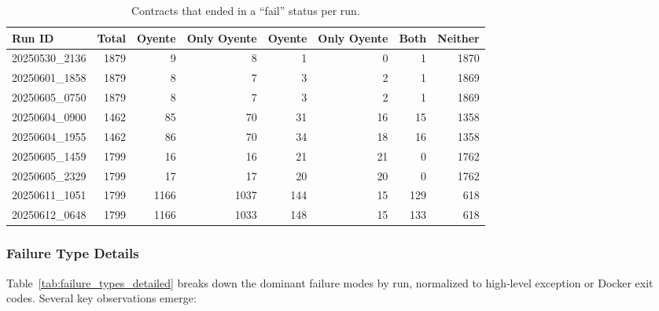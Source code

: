 \documentclass{article}
\newcommand\OY{Oyente}
\newcommand\OYp{\OY\raisebox{0.3ex}{\smaller +}}
\newcommand\CGTrbcA{20250530\_2136}%
\newcommand\CGTrbcB{20250601\_1858}%
\newcommand\CGTrbcC{20250605\_0750}%
\newcommand\CGTsscA{20250604\_0900}%
\newcommand\CGTsscB{20250604\_1955}%
\newcommand\SKCrbcA{20250605\_1459}%
\newcommand\SKCrbcB{20250605\_2329}%
\newcommand\SKCsscA{20250611\_1051}%
\newcommand\SKCsscB{20250612\_0648}%
\begin{document}
	\begin{table}[ht]
		\centering
		\begin{tabular}{lrrrrrrr}
			\toprule
			\textbf{Run ID}      & \textbf{Total} & \textbf{\OY} & \textbf{Only \OY}
			& \textbf{\OYp} & \textbf{Only \OYp}
			& \textbf{Both}   & \textbf{Neither} \\
			\midrule
			\CGTrbcA & 1879 & 9 & 8 & 1 & 0 & 1 & 1870 \\
			\CGTrbcB & 1879 & 8 & 7 & 3 & 2 & 1 & 1869 \\
			\CGTrbcC & 1879 & 8 & 7 & 3 & 2 & 1 & 1869 \\
			\CGTsscA & 1462 & 85 & 70 & 31 & 16 & 15 & 1358 \\
			\CGTsscB & 1462 & 86 & 70 & 34 & 18 & 16 & 1358 \\
			\SKCrbcA & 1799 & 16 & 16 & 21 & 21 & 0 & 1762 \\
			\SKCrbcB & 1799 & 17 & 17 & 20 & 20 & 0 & 1762 \\
			\SKCsscA & 1799 & 1166 & 1037 & 144 & 15 & 129 & 618 \\
			\SKCsscB & 1799 & 1166 & 1033 & 148 & 15 & 133 & 618 \\
			\bottomrule
		\end{tabular}
		\caption{Contracts that ended in a “fail” status per run.}
		\label{tab:failure_summary}
	\end{table}

	\subsubsection{Failure Type Details}
	Table~\ref{tab:failure_types_detailed} breaks down the dominant failure modes by run, normalized to high‐level exception or Docker exit codes. Several key observations emerge:
\end{document}
